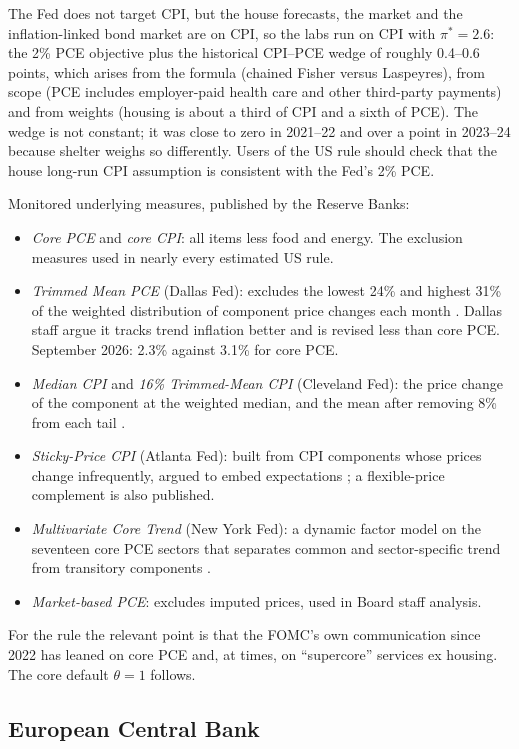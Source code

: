 \documentclass[11pt,a4paper]{article}
\newcommand{\pis}{\pi^{*}}
\begin{document}
The Fed does not target CPI, but the house forecasts, the market and the inflation-linked bond market are on CPI, so the labs run on CPI with $\pis=2.6$: the 2\% PCE objective plus the historical CPI--PCE wedge of roughly 0.4--0.6 points, which arises from the formula (chained Fisher versus Laspeyres), from scope (PCE includes employer-paid health care and other third-party payments) and from weights (housing is about a third of CPI and a sixth of PCE). The wedge is not constant; it was close to zero in 2021--22 and over a point in 2023--24 because shelter weighs so differently. Users of the US rule should check that the house long-run CPI assumption is consistent with the Fed's 2\% PCE.

Monitored underlying measures, published by the Reserve Banks:
\begin{itemize}
\item \emph{Core PCE} and \emph{core CPI}: all items less food and energy. The exclusion measures used in nearly every estimated US rule.
\item \emph{Trimmed Mean PCE} (Dallas Fed): excludes the lowest 24\% and highest 31\% of the weighted distribution of component price changes each month \parencite{dolmas2005}. Dallas staff argue it tracks trend inflation better and is revised less than core PCE. September 2026: 2.3\% against 3.1\% for core PCE.
\item \emph{Median CPI} and \emph{16\% Trimmed-Mean CPI} (Cleveland Fed): the price change of the component at the weighted median, and the mean after removing 8\% from each tail \parencite{bryancecchetti1994}.
\item \emph{Sticky-Price CPI} (Atlanta Fed): built from CPI components whose prices change infrequently, argued to embed expectations \parencite{brysonbuchanan2010}; a flexible-price complement is also published.
\item \emph{Multivariate Core Trend} (New York Fed): a dynamic factor model on the seventeen core PCE sectors that separates common and sector-specific trend from transitory components \parencite{nyfedmct}.
\item \emph{Market-based PCE}: excludes imputed prices, used in Board staff analysis.
\end{itemize}
For the rule the relevant point is that the FOMC's own communication since 2022 has leaned on core PCE and, at times, on ``supercore'' services ex housing. The core default $\theta=1$ follows.

\subsection{European Central Bank}
\end{document}
